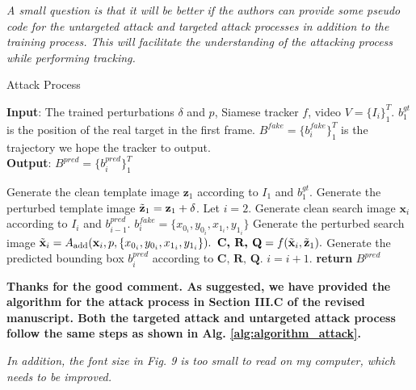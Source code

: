 \documentclass[12pt]{article}
\begin{document}
\textit{A small question is that it will be better if the authors can provide some pseudo code for the untargeted attack and targeted attack processes in addition to the training process. This will facilitate the understanding of the attacking process while performing tracking.}

\begin{algorithm}[t]
    \renewcommand\thealgorithm{2}
    \caption{Attack Process}
    \label{alg:algorithm_attack}
    \textbf{Input}: The trained perturbations $\delta$ and $p$, Siamese tracker $f$, video $V=\{I_i\}_1^T$. $b^{gt}_1$ is the position of the real target in the first frame. $B^{fake}=\{b^{fake}_i\}_1^{T}$ is the trajectory we hope the tracker to output.\\
    \textbf{Output}: $B^{pred}=\{b^{pred}_i\}_1^{T}$
    \begin{algorithmic}[1] %
      \STATE Generate the clean template image $\textbf{z}_1$ according to $I_1$ and $b^{gt}_1$.
      \STATE Generate the perturbed template image $\tilde{\textbf z}_1=\textbf z_1+\delta$.
      \STATE Let $i = 2$.
    \STATE Generate clean search image $\textbf{x}_i$ according to $I_i$ and $b^{pred}_{i-1}$.
    \STATE $b^{fake}_i=\{x_{0_i}, y_{0_i}, x_{1_i}, y_{1_i}\}$
    \STATE Generate the perturbed search image $\tilde{\textbf x}_i = A_{\text{add}}(\textbf x_i, p, \{x_{0_i}, y_{0_i}, x_{1_i}, y_{1_i}\}).$
    \STATE $\textbf{C, R, Q} = f(\tilde {\textbf x}_i, \tilde{\textbf z}_1).$
    \STATE Generate the predicted bounding box $b^{pred}_i$ according to $\textbf{C, R, Q}$.
    \STATE $i = i + 1.$
    \ENDWHILE
    \STATE \textbf{return} $B^{pred}$
    \end{algorithmic}
\end{algorithm}

\textbf{
Thanks for the good comment. As suggested, we have provided the algorithm for the attack process in Section III.C of the revised manuscript.
Both the targeted attack and untargeted attack process follow the same steps as shown in Alg. \ref{alg:algorithm_attack}.
}

\textit{In addition, the font size in Fig. 9 is too small to read on my computer, which needs to be improved.}
\end{document}
